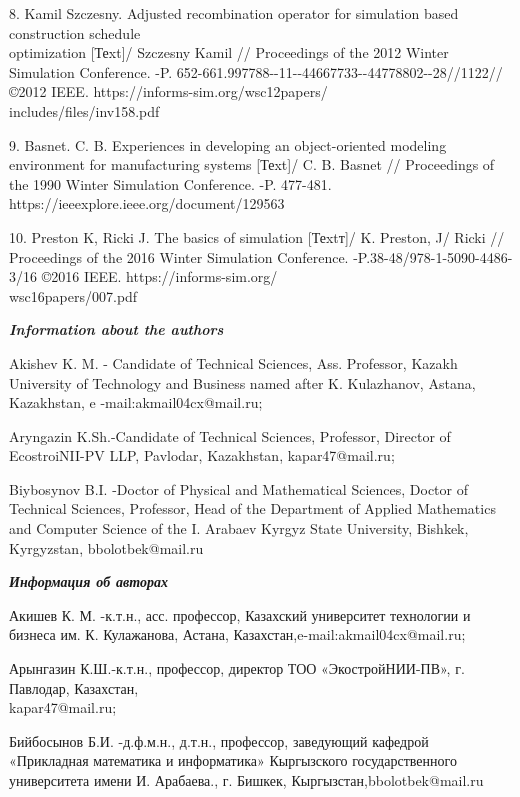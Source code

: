 \begin{noparindent}
8. Kamil Szczesny. Adjusted recombination operator for simulation based
construction schedule \\optimization {[}Теxt{]}/ Szczesny Kamil //
Proceedings of the 2012 Winter Simulation Conference. -P.
652-661.997788-\/-11-\/-44667733-\/-44778802-\/-28//1122//©2012 IEEE.
https://informs-sim.org/wsc12papers/\\includes/files/inv158.pdf

9. Basnet. C. B. Experiences in developing an object-oriented modeling
environment for manufacturing systems {[}Теxt{]}/ C. B. Basnet //
Proceedings of the 1990 Winter Simulation Conference. -P. 477-481.
https://ieeexplore.ieee.org/document/129563

10. Preston K, Ricki J. The basics of simulation {[}Теxtт{]}/ K.
Preston, J/ Ricki // Proceedings of the 2016 Winter Simulation
Conference. -P.38-48/978-1-5090-4486-3/16 ©2016 IEEE.
https://informs-sim.org/\\wsc16papers/007.pdf
\end{noparindent}

\emph{{\bfseries Information about the authors}}
\begin{noparindent}

Akishev K. M. - Candidate of Technical Sciences, Ass. Professor, Kazakh
University of Technology and Business named after K. Kulazhanov, Astana,
Kazakhstan, e -mail:akmail04cx@mail.ru;

Aryngazin K.Sh.-Candidate of Technical Sciences, Professor, Director of
EcostroiNII-PV LLP, Pavlodar, Kazakhstan, kapar47@mail.ru;

Biybosynov B.I. -Doctor of Physical and Mathematical Sciences, Doctor
of Technical Sciences, Professor, Head of the Department of Applied
Mathematics and Computer Science of the I. Arabaev Kyrgyz State
University, Bishkek, Kyrgyzstan, bbolotbek@mail.ru
\end{noparindent}

\emph{{\bfseries Информация об авторах}}
\begin{noparindent}

Акишев К. М. -к.т.н., асс. профессор, Казахский университет технологии и
бизнеса им. К. Кулажанова, Астана, Казахстан,e-mail:akmail04cx@mail.ru;

Арынгазин К.Ш.-к.т.н., профессор, директор ТОО «ЭкостройНИИ-ПВ», г.
Павлодар, Казахстан, \\kapar47@mail.ru;

Бийбосынов Б.И. -д.ф.м.н., д.т.н., профессор, заведующий кафедрой
«Прикладная математика и информатика» Кыргызского государственного
университета имени И. Арабаева., г. Бишкек, Кыргызстан,bbolotbek@mail.ru
\end{noparindent}
